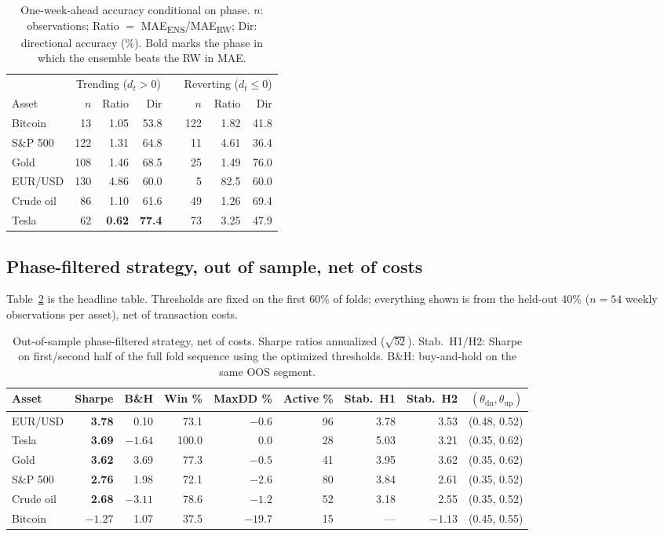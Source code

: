 \documentclass[11pt,a4paper]{article}
\begin{document}
\begin{table}[H]
\centering\small
\caption{One-week-ahead accuracy conditional on phase. $n$: observations; Ratio $=$ MAE\textsubscript{ENS}/MAE\textsubscript{RW}; Dir: directional accuracy (\%). Bold marks the phase in which the ensemble beats the RW in MAE.}
\label{tab:phase}
\begin{tabular}{l rrr c rrr}
\toprule
& \multicolumn{3}{c}{Trending ($d_t>0$)} & & \multicolumn{3}{c}{Reverting ($d_t\le 0$)} \\
\cmidrule{2-4}\cmidrule{6-8}
Asset & $n$ & Ratio & Dir & & $n$ & Ratio & Dir \\
\midrule
Bitcoin & 13 & 1.05 & 53.8 & & 122 & 1.82 & 41.8 \\
S\&P 500 & 122 & 1.31 & 64.8 & & 11 & 4.61 & 36.4 \\
Gold & 108 & 1.46 & 68.5 & & 25 & 1.49 & 76.0 \\
EUR/USD & 130 & 4.86 & 60.0 & & 5 & 82.5 & 60.0 \\
Crude oil & 86 & 1.10 & 61.6 & & 49 & 1.26 & 69.4 \\
Tesla & 62 & \textbf{0.62} & \textbf{77.4} & & 73 & 3.25 & 47.9 \\
\bottomrule
\end{tabular}
\end{table}

\subsection{Phase-filtered strategy, out of sample, net of costs}

Table~\ref{tab:strategy} is the headline table. Thresholds are fixed on the first 60\% of folds; everything shown is from the held-out 40\% ($n = 54$ weekly observations per asset), net of transaction costs.

\begin{table}[H]
\centering\small
\caption{Out-of-sample phase-filtered strategy, net of costs. Sharpe ratios annualized ($\sqrt{52}$). Stab.\ H1/H2: Sharpe on first/second half of the full fold sequence using the optimized thresholds. B\&H: buy-and-hold on the same OOS segment.}
\label{tab:strategy}
\begin{tabular}{l rrrrr rr r}
\toprule
Asset & Sharpe & B\&H & Win \% & MaxDD \% & Active \% & Stab.\ H1 & Stab.\ H2 & $(\theta_{\mathrm{dn}},\theta_{\mathrm{up}})$ \\
\midrule
EUR/USD & \textbf{3.78} & 0.10 & 73.1 & $-0.6$ & 96 & 3.78 & 3.53 & (0.48, 0.52) \\
Tesla & \textbf{3.69} & $-1.64$ & 100.0 & 0.0 & 28 & 5.03 & 3.21 & (0.35, 0.62) \\
Gold & \textbf{3.62} & 3.69 & 77.3 & $-0.5$ & 41 & 3.95 & 3.62 & (0.35, 0.62) \\
S\&P 500 & \textbf{2.76} & 1.98 & 72.1 & $-2.6$ & 80 & 3.84 & 2.61 & (0.35, 0.52) \\
Crude oil & \textbf{2.68} & $-3.11$ & 78.6 & $-1.2$ & 52 & 3.18 & 2.55 & (0.35, 0.52) \\
Bitcoin & $-1.27$ & 1.07 & 37.5 & $-19.7$ & 15 & --- & $-1.13$ & (0.45, 0.55) \\
\bottomrule
\end{tabular}
\end{table}
\end{document}
